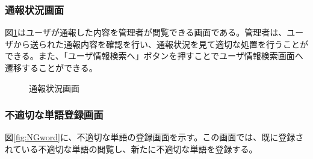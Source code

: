 \documentclass[a4j]{jarticle}
\begin{document}
\subsubsection{通報状況画面}
図\ref{fig:report_admin}はユーザが通報した内容を管理者が閲覧できる画面である。管理者は、ユーザから送られた通報内容を確認を行い、通報状況を見て適切な処置を行うことができる。また、「ユーザ情報検索へ」ボタンを押すことでユーザ情報検索画面へ遷移することができる。
\begin{figure}[H]
\begin{center}
\caption{通報状況画面}
\label{fig:report_admin}
\end{center}
\end{figure}

\subsubsection{不適切な単語登録画面}
図\ref{fig:NGword}に、不適切な単語の登録画面を示す。この画面では、既に登録されている不適切な単語の閲覧し、新たに不適切な単語を登録する。
\end{document}
